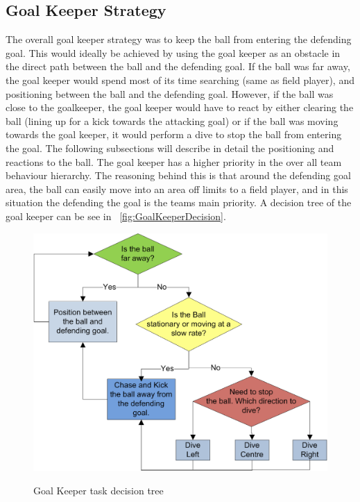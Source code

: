 \subsection{Goal Keeper Strategy}
The overall goal keeper strategy was to keep the ball from entering the defending goal. This would ideally be achieved by using the goal keeper as an obstacle in the direct path between the ball and the defending goal. If the ball was far away, the goal keeper would spend most of its time searching (same as field player), and positioning between the ball and the defending goal. However, if the ball was close to the goalkeeper, the goal keeper would have to react by either clearing the ball (lining up for a kick towards the attacking goal) or if the ball was moving towards the goal keeper, it would perform a dive to stop the ball from entering the goal. The following subsections will describe in detail the positioning and reactions to the ball. The goal keeper has a higher priority in the over all team behaviour hierarchy. The reasoning behind this is that around the defending goal area, the ball can easily move into an area off limits to a field player, and in this situation the defending the goal is the teams main priority. A decision tree of the goal keeper can be see in ~\autoref{fig:GoalKeeperDecision}.

\begin{figure}[htpb]
\begin{center}
   \leavevmode
    \scalebox{0.8} {\includegraphics{aaronfigs/GoalKeeperDecisions.png} }
    \caption{Goal Keeper task decision tree}
    \label{fig:GoalKeeperDecision}
\end{center}
\end{figure}

